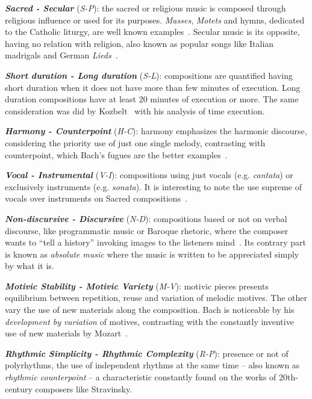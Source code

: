 \documentclass[
 aip,
 jmp,
 amsmath,amssymb,
 reprint,
]{revtex4-1}
\begin{document}
{\bf \em{ Sacred - Secular}} (\emph{S-P}): the sacred or religious music is
composed through religious influence or used for its purposes. \textit{Masses},
\textit{Motets} and hymns, dedicated to the Catholic liturgy, are well known examples~\cite{Lovelock}. Secular
music is its opposite, having no relation with religion, also known as
popular songs like Italian madrigals and German \textit{Lieds}~\cite{BennettHistory}. 

{\bf \em{ Short duration - Long duration}} (\emph{S-L}): compositions are
quantified having short duration when it does not have more than few minutes
of execution. Long duration compositions have at least 20 minutes of execution or
more. The same consideration was did by Kozbelt~\cite{Kozbelt01012009,
  Kozbelt01012007} with his analysis of time execution.

{\bf \em{ Harmony - Counterpoint}} (\emph{H-C}): harmony emphasizes the harmonic
discourse, considering the priority use of just one single melody,
contrasting with counterpoint, which Bach's fugues are the better examples~\cite{BennettHistory}.

{\bf \em{ Vocal - Instrumental}} (\emph{V-I}): compositions using just vocals
(e.g. \emph{cantata}) or exclusively instruments
(e.g. \emph{sonata}). It is interesting to note the use supreme of
vocals over instruments on Sacred compositions~\cite{Lovelock}.

{\bf \em{ Non-discursive - Discursive}} (\emph{N-D}): compositions
based or not
on verbal discourse, like programmatic music or Baroque rhetoric, where the composer wants
to ``tell a history'' invoking images to the listeners
mind~\cite{BennettHistory}. Its contrary part is known as
\textit{absolute music} where the music is written to be appreciated simply
by what it is.

{\bf \em{ Motivic Stability - Motivic Variety}} (\emph{M-V}): motivic pieces presents equilibrium
between repetition, reuse and variation of melodic motives. The other vary the use of new
materials along the composition. Bach is noticeable by his
\textit{development by variation} of motives, contrasting with the
constantly inventive use of new materials by Mozart~\cite{Webern}.

{\bf \em{ Rhythmic Simplicity - Rhythmic Complexity}} (\emph{R-P}): presence or not of polyrhythms, the
use of independent rhythms at the same time -- also known as
\textit{rhythmic counterpoint}\cite{BennettHistory} -- a characteristic
constantly found on the works of 20th-century composers like Stravinsky.
\end{document}
